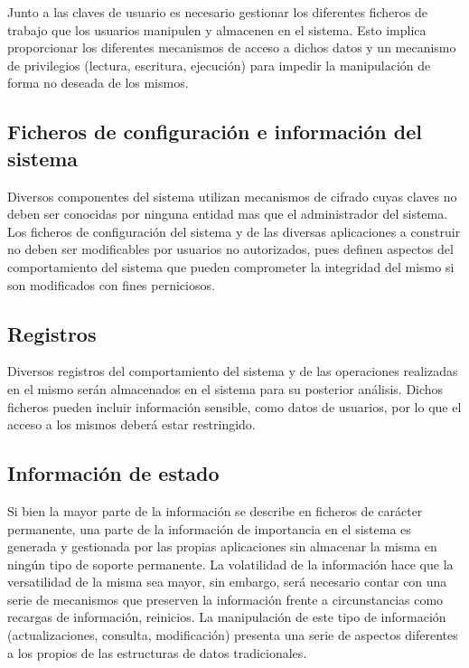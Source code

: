 Junto a las claves de usuario es necesario gestionar los diferentes ficheros de trabajo que los usuarios manipulen y almacenen en el sistema. Esto implica proporcionar los diferentes mecanismos de acceso a dichos datos y un mecanismo de privilegios (lectura, escritura, ejecución) para impedir la manipulación de forma no deseada de los mismos.

\subsection{Ficheros de configuración e información del sistema}

Diversos componentes del sistema utilizan mecanismos de cifrado cuyas claves no deben ser conocidas por ninguna entidad mas que el administrador del sistema. Los ficheros de configuración del sistema y de las diversas aplicaciones a construir no deben ser modificables por usuarios no autorizados, pues definen aspectos del comportamiento del sistema que pueden comprometer la integridad del mismo si son modificados con fines perniciosos.

\subsection{Registros}

Diversos registros del comportamiento del sistema y de las operaciones realizadas en el mismo serán almacenados en el sistema para su posterior análisis. Dichos ficheros pueden incluir información sensible, como datos de usuarios, por lo que el acceso a los mismos deberá estar restringido.

\subsection{Información de estado}

Si bien la mayor parte de la información se describe en ficheros de carácter permanente, una parte de la información de importancia en el sistema es generada y gestionada por las propias aplicaciones sin almacenar la misma en ningún tipo de soporte permanente. La volatilidad de la información hace que la versatilidad de la misma sea mayor, sin embargo, será necesario contar con una serie de mecanismos que preserven la información frente a circunstancias como recargas de información, reinicios. La manipulación de este tipo de información (actualizaciones, consulta, modificación) presenta una serie de aspectos diferentes a los propios de las estructuras de datos tradicionales.

